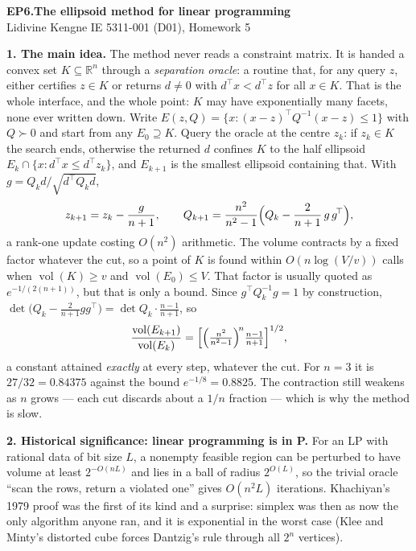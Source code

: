 \documentclass[10pt]{article}
\DeclareMathOperator{\vol}{vol}
\begin{document}
{\large\bfseries EP6.\quad The ellipsoid method for linear programming}\\[1pt]
{\small Lidivine Kengne \quad\textbar\quad IE 5311-001 (D01), Homework 5}
\vspace{0.3em}

\textbf{1. The main idea.}
The method never reads a constraint matrix. It is handed a convex set
$K \subseteq \mathbb{R}^n$ through a \emph{separation oracle}: a
routine that, for any query $z$, either certifies $z \in K$ or returns
$d \neq 0$ with $d^{\!\top}x < d^{\!\top}z$ for all $x \in K$. That is
the whole interface, and the whole point: $K$ may have exponentially
many facets, none ever written down. Write $E(z,Q) = \{x : (x-z)^{\!\top}Q^{-1}(x-z) \le 1\}$ with
$Q \succ 0$ and start from any $E_0 \supseteq K$. Query the oracle at
the centre $z_k$: if $z_k \in K$ the search ends, otherwise the
returned $d$ confines $K$ to the half ellipsoid
$E_k \cap \{x : d^{\!\top}x \le d^{\!\top}z_k\}$, and $E_{k+1}$ is the
smallest ellipsoid containing that. With
$g = Q_k d / \sqrt{d^{\!\top} Q_k d}$,
\[
  z_{k+1} = z_k - \frac{g}{n+1},
  \qquad
  Q_{k+1} = \frac{n^{2}}{n^{2}-1}
            \Bigl( Q_k - \frac{2}{n+1}\, g\,g^{\!\top} \Bigr),
\]
a rank-one update costing $O(n^2)$ arithmetic. The volume contracts by
a fixed factor whatever the cut, so a point of $K$ is found within
$O(n \log(V/v))$ calls when $\vol(K) \ge v$ and $\vol(E_0) \le V$. That
factor is usually quoted as $e^{-1/(2(n+1))}$, but that is only a
bound. Since
$g^{\!\top}Q_k^{-1}g = 1$ by construction,
$\det\bigl(Q_k - \tfrac{2}{n+1}gg^{\!\top}\bigr)
 = \det Q_k \cdot \tfrac{n-1}{n+1}$, so
\[
  \frac{\vol(E_{k+1})}{\vol(E_k)}
  = \Bigl[\Bigl(\tfrac{n^{2}}{n^{2}-1}\Bigr)^{\! n}
          \tfrac{n-1}{n+1}\Bigr]^{1/2},
\]
a constant attained \emph{exactly} at every step, whatever the cut.
For $n = 3$ it is $27/32 = 0.84375$ against the bound
$e^{-1/8} = 0.8825$. The contraction still weakens as $n$ grows ---
each cut discards about a $1/n$ fraction --- which is why the method
is slow.

\textbf{2. Historical significance: linear programming is in P.}
For an LP with rational data of bit size $L$, a nonempty feasible
region can be perturbed to have volume at least $2^{-O(nL)}$ and lies
in a ball of radius $2^{O(L)}$, so the trivial oracle ``scan the rows,
return a violated one'' gives $O(n^2 L)$ iterations. Khachiyan's 1979
proof was the first of its kind and a surprise: simplex was then as
now the only algorithm anyone ran, and it is exponential in the worst
case (Klee and Minty's distorted cube forces Dantzig's rule through
all $2^n$ vertices).
\end{document}
